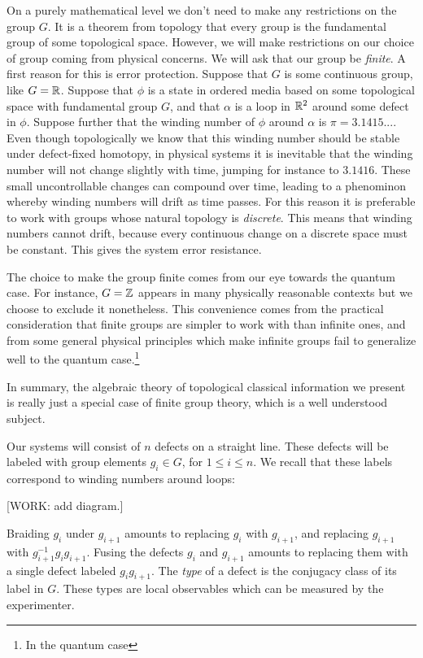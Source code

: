 On a purely mathematical level we don't need to make any restrictions on the group $G$. It is a theorem from topology that every group is the fundamental group of some topological space. However, we will make restrictions on our choice of group coming from physical concerns. We will ask that our group be \textit{finite}. A first reason for this is error protection. Suppose that $G$ is some continuous group, like $G=\mathbb{R}$. Suppose that $\phi$ is a state in ordered media based on some topological space with fundamental group $G$, and that $\alpha$ is a loop in $\mathbb{R}^2$ around some defect in $\phi$. Suppose further that the winding number of $\phi$ around $\alpha$ is $\pi=3.1415...$. Even though topologically we know that this winding number should be stable under defect-fixed homotopy, in physical systems it is inevitable that the winding number will not change slightly with time, jumping for instance to $3.1416$. These small uncontrollable changes can compound over time, leading to a phenominon whereby winding numbers will drift as time passes. For this reason it is preferable to work with groups whose natural topology is \textit{discrete}. This means that winding numbers cannot drift, because every continuous change on a discrete space must be constant. This gives the system error resistance.

The choice to make the group finite comes from our eye towards the quantum case. For instance, $G=\mathbb{Z}$ appears in many physically reasonable contexts but we choose to exclude it nonetheless. This convenience comes from the practical consideration that finite groups are simpler to work with than infinite ones, and from some general physical principles which make infinite groups fail to generalize well to the quantum case.\footnote{In the quantum case}

In summary, the algebraic theory of topological classical information we present is really just a special case of finite group theory, which is a well understood subject.

Our systems will consist of $n$ defects on a straight line. These defects will be labeled with group elements $g_i\in G$, for $1\leq i \leq n$. We recall that these labels correspond to winding numbers around loops:

[WORK: add diagram.]

Braiding $g_i$ under $g_{i+1}$ amounts to replacing $g_i$ with $g_{i+1}$, and replacing $g_{i+1}$ with $g_{i+1}^{-1}g_i g_{i+1}$. Fusing the defects $g_{i}$ and $g_{i+1}$ amounts to replacing them with a single defect labeled $g_{i}g_{i+1}$. The \textit{type} of a defect is the conjugacy class of its label in $G$. These types are local observables which can be measured by the experimenter.


